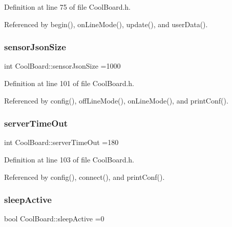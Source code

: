 Definition at line 75 of file Cool\+Board.\+h.



Referenced by begin(), on\+Line\+Mode(), update(), and user\+Data().

\mbox{\label{classCoolBoard_a58e4b6072e3ac8b141ec0befb479208e}} 
\subsubsection{\texorpdfstring{sensor\+Json\+Size}{sensorJsonSize}}
{\footnotesize\ttfamily int Cool\+Board\+::sensor\+Json\+Size =1000\hspace{0.3cm}{\ttfamily [private]}}



Definition at line 101 of file Cool\+Board.\+h.



Referenced by config(), off\+Line\+Mode(), on\+Line\+Mode(), and print\+Conf().

\mbox{\label{classCoolBoard_a7a8d8d3d316220cdd049cd63c1aa8fe6}} 
\subsubsection{\texorpdfstring{server\+Time\+Out}{serverTimeOut}}
{\footnotesize\ttfamily int Cool\+Board\+::server\+Time\+Out =180\hspace{0.3cm}{\ttfamily [private]}}



Definition at line 103 of file Cool\+Board.\+h.



Referenced by config(), connect(), and print\+Conf().

\mbox{\label{classCoolBoard_a0a51b2287139f66c738101fb53139230}} 
\subsubsection{\texorpdfstring{sleep\+Active}{sleepActive}}
{\footnotesize\ttfamily bool Cool\+Board\+::sleep\+Active =0\hspace{0.3cm}{\ttfamily [private]}}



